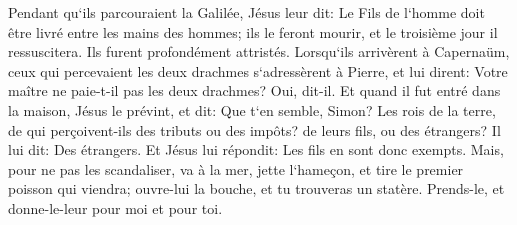 \verse Pendant qu`ils parcouraient la Galilée, Jésus leur dit: Le Fils de l`homme doit être livré entre les mains des hommes; 
\verse ils le feront mourir, et le troisième jour il ressuscitera. Ils furent profondément attristés. 
\verse Lorsqu`ils arrivèrent à Capernaüm, ceux qui percevaient les deux drachmes s`adressèrent à Pierre, et lui dirent: Votre maître ne paie-t-il pas les deux drachmes? 
\verse Oui, dit-il. Et quand il fut entré dans la maison, Jésus le prévint, et dit: Que t`en semble, Simon? Les rois de la terre, de qui perçoivent-ils des tributs ou des impôts? de leurs fils, ou des étrangers? 
\verse Il lui dit: Des étrangers. Et Jésus lui répondit: Les fils en sont donc exempts. 
\verse Mais, pour ne pas les scandaliser, va à la mer, jette l`hameçon, et tire le premier poisson qui viendra; ouvre-lui la bouche, et tu trouveras un statère. Prends-le, et donne-le-leur pour moi et pour toi. 

\chapter{}

